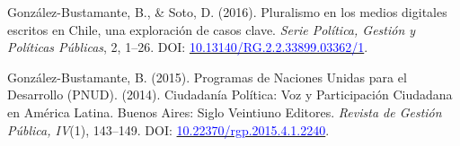 \begin{publications}
\begin{benumerate}{8}
\item{González-Bustamante, B., \& Soto, D. (2016). Pluralismo en los medios digitales escritos en Chile, una exploración de casos clave. {\itshape Serie Política, Gestión y Políticas Públicas}, 2, 1--26. DOI: \href{http://doi.org/10.13140/RG.2.2.33899.03362/1}{\textcolor{blue}{10.13140/RG.2.2.33899.03362/1}}.}\vspace{1mm}

\item{González-Bustamante, B. (2015). Programas de Naciones Unidas para el Desarrollo (PNUD). (2014). Ciudadanía Política: Voz y Participación Ciudadana en América Latina. Buenos Aires: Siglo Veintiuno Editores. {\itshape Revista de Gestión Pública, IV}(1), 143--149. DOI: \href{https://doi.org/10.22370/rgp.2015.4.1.2240}{\textcolor{blue}{10.22370/rgp.2015.4.1.2240}}.}

\end{benumerate}

\end{publications}
\pagebreak
